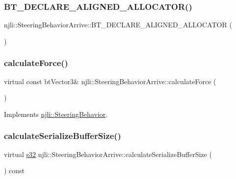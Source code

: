 \subsubsection{\texorpdfstring{B\+T\+\_\+\+D\+E\+C\+L\+A\+R\+E\+\_\+\+A\+L\+I\+G\+N\+E\+D\+\_\+\+A\+L\+L\+O\+C\+A\+T\+O\+R()}{BT\_DECLARE\_ALIGNED\_ALLOCATOR()}}
{\footnotesize\ttfamily njli\+::\+Steering\+Behavior\+Arrive\+::\+B\+T\+\_\+\+D\+E\+C\+L\+A\+R\+E\+\_\+\+A\+L\+I\+G\+N\+E\+D\+\_\+\+A\+L\+L\+O\+C\+A\+T\+OR (\begin{DoxyParamCaption}{ }\end{DoxyParamCaption})\hspace{0.3cm}{\ttfamily [protected]}}

\mbox{\label{classnjli_1_1_steering_behavior_arrive_ae878be98da62eef4bb606937e5e944e7}} 
\subsubsection{\texorpdfstring{calculate\+Force()}{calculateForce()}}
{\footnotesize\ttfamily virtual const bt\+Vector3\& njli\+::\+Steering\+Behavior\+Arrive\+::calculate\+Force (\begin{DoxyParamCaption}{ }\end{DoxyParamCaption})\hspace{0.3cm}{\ttfamily [virtual]}}



Implements \mbox{\hyperlink{classnjli_1_1_steering_behavior_a9720953de1268f658636213946d76ed3}{njli\+::\+Steering\+Behavior}}.

\mbox{\label{classnjli_1_1_steering_behavior_arrive_a35e76ca4d74688cd292034313bffe888}} 
\subsubsection{\texorpdfstring{calculate\+Serialize\+Buffer\+Size()}{calculateSerializeBufferSize()}}
{\footnotesize\ttfamily virtual \mbox{\hyperlink{_util_8h_aa62c75d314a0d1f37f79c4b73b2292e2}{s32}} njli\+::\+Steering\+Behavior\+Arrive\+::calculate\+Serialize\+Buffer\+Size (\begin{DoxyParamCaption}{ }\end{DoxyParamCaption}) const\hspace{0.3cm}{\ttfamily [virtual]}}

